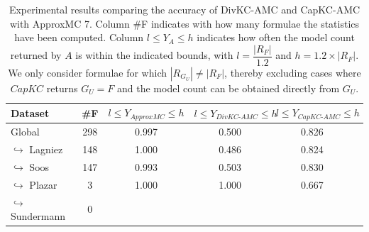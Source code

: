 \documentclass{article}
\newcommand\approxmc[0]{ApproxMC\xspace}
\newcommand\divkcamc[0]{DivKC-AMC\xspace}
\newcommand\capkc[0]{CapKC\xspace}
\newcommand\capkcamc[0]{CapKC-AMC\xspace}
\begin{document}
    
\begin{table}[h!]
        \centering
            \begin{tabular}{l|c|c|c|c|c}
                Dataset & \#F & $l \leq Y_{\textit{\approxmc}} \leq h$ & $l \leq Y_{\textit{\divkcamc}} \leq h$ & $l \leq Y_{\textit{\capkcamc}} \leq h$ \\ 
                \hline 
Global & 298 & 0.997 & 0.500 & 0.826 \\
$\hookrightarrow$ Lagniez \cite{D4} & 148 & 1.000 & 0.486 & 0.824 \\
$\hookrightarrow$ Soos \cite{soos_2024_10449477} & 147 & 0.993 & 0.503 & 0.830 \\
$\hookrightarrow$ Plazar \cite{Plazar2019} & 3 & 1.000 & 1.000 & 0.667 \\
$\hookrightarrow$ Sundermann \cite{SBK+:SPLC24} & 0 & & & & \\
            \end{tabular}
                \caption{Experimental results comparing the accuracy of \divkcamc and \capkcamc with \approxmc7.
            Column \#F indicates with how many formulae the statistics have been computed.
            Column $l \leq Y_{A} \leq h$ indicates how often the model count returned by $A$ is within the indicated bounds, with $l = \dfrac{|R_F|}{1.2}$ and $h = 1.2 \times |R_F|$.
            We only consider formulae for which $|R_{G_U}| \neq |R_F|$, thereby excluding cases where $\capkc$ returns $G_U = F$ and the model count can be obtained directly from $G_U$.
        }
        \label{divkc:tab:appmc:acc:filter}
    \end{table}
\end{document}
